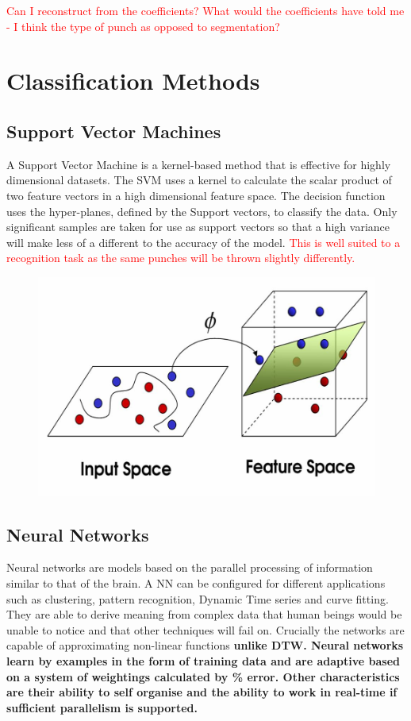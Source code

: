 \textcolor{red}{Can I reconstruct from the coefficients? What would the coefficients have told me - I think the type of punch as opposed to segmentation?}


\section{Classification Methods}

\subsection{Support Vector Machines}
A Support Vector Machine is a kernel-based method that is effective for highly dimensional datasets. The SVM uses a kernel to calculate the scalar product of two feature vectors in a high dimensional feature space. The decision function uses the hyper-planes, defined by the Support  vectors,  to  classify  the  data.  Only  significant  samples  are  taken  for  use  as support vectors so that a high variance will make less of a different to the accuracy of the model. \textcolor{red}{This is well suited to a recognition task as the same punches will be thrown slightly differently.}

\begin{figure}[h]
    \centering
    \includegraphics[height=0.25\textheight]{fig02/svm}
    \label{fig:kinect}
\end{figure}

\subsection{Neural Networks}
Neural networks are models based on the parallel processing of information similar to that of the brain. A NN can be configured for different applications such as clustering, pattern recognition, Dynamic Time series and curve fitting. They are able to derive meaning from complex data that human beings would be unable to notice and that other techniques will fail on. Crucially the networks are capable of approximating non-linear functions \textbf{unlike DTW. Neural networks learn by examples in the form of training data and are adaptive based on a system of weightings calculated by \% error. Other characteristics are their ability to self organise and the ability to work in real-time if sufficient parallelism is supported.}


